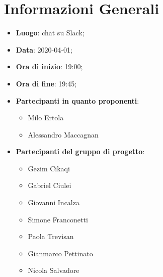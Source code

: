 \section{Informazioni Generali}
	\begin{itemize}
		\item \textbf {Luogo}: chat su Slack;
		\item \textbf {Data}: 2020-04-01;
		\item \textbf {Ora di inizio}: 19:00;
		\item \textbf {Ora di fine}: 19:45;
		\item \textbf {Partecipanti in quanto proponenti}:
		  \begin{itemize}
		    \item Milo Ertola
		    \item Alessandro Maccagnan
		  \end{itemize}
		\item \textbf {Partecipanti del gruppo di progetto}:
			\begin{itemize}
				\item Gezim Cikaqi
				\item Gabriel Ciulei
				\item Giovanni Incalza
				\item Simone Franconetti
				\item Paola Trevisan
				\item Gianmarco Pettinato
				\item Nicola Salvadore
			\end{itemize}
	\end{itemize}
